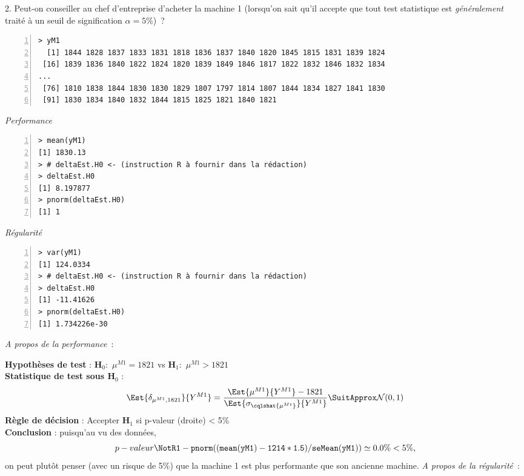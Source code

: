 \documentclass[10pt]{report}
\begin{document}
\begin{exercice}
2. Peut-on conseiller au chef d'entreprise d'acheter la machine 1 (lorsqu'on sait qu'il accepte que tout test statistique est \textit{g{\'e}n{\'e}ralement} trait{\'e} {\`a} un seuil de signification $\alpha=5\%$)~? \\

\IndicR
\begin{Verbatim}[frame=leftline,fontfamily=tt,fontshape=n,numbers=left]
> yM1
  [1] 1844 1828 1837 1833 1831 1818 1836 1837 1840 1820 1845 1815 1831 1839 1824
 [16] 1839 1836 1840 1822 1824 1820 1839 1849 1846 1817 1822 1832 1846 1832 1834
...
 [76] 1810 1838 1844 1830 1830 1829 1807 1797 1814 1807 1844 1834 1827 1841 1830
 [91] 1830 1834 1840 1832 1844 1815 1825 1821 1840 1821
\end{Verbatim}

\noindent \textit{Performance}
\begin{Verbatim}[frame=leftline,fontfamily=tt,fontshape=n,numbers=left]
> mean(yM1)
[1] 1830.13
> # deltaEst.H0 <- (instruction R à fournir dans la rédaction)
> deltaEst.H0
[1] 8.197877
> pnorm(deltaEst.H0)
[1] 1
\end{Verbatim}

\noindent \textit{Régularité}
\begin{Verbatim}[frame=leftline,fontfamily=tt,fontshape=n,numbers=left]
> var(yM1)
[1] 124.0334
> # deltaEst.H0 <- (instruction R à fournir dans la rédaction)
> deltaEst.H0
[1] -11.41626
> pnorm(deltaEst.H0)
[1] 1.734226e-30
\end{Verbatim}

 

\begin{Correction}
\noindent \textit{A propos de la performance}~:

\noindent \textbf{Hypothèses de test} : $\mathbf{H}_0:$ $\mu^{M1}=1821$ vs {\large $\mathbf{H}_1:$ $\mu^{M1}>1821$}\\
\textbf{Statistique de test sous $\mathbf{H}_0$} :
  $$
  \Est{\delta_{\mu^{M1},1821}}{Y^{M1}}= {\displaystyle \frac{\Est{\mu^{M1}}{Y^{M1}}-1821}{
\Est{\sigma_{\cqlshat{\mu^{M1}}}}{Y^{M1}}
}} 
  \SuitApprox \mathcal{N}(0,1)
  $$
\textbf{Règle de décision} : Accepter $\mathbf{H}_1$ si 
  p-valeur (droite) < 5\%\\
\noindent \textbf{Conclusion} :
puisqu'au vu des données, 
  \[
p-valeur\NotR\mathtt{1-pnorm((mean(yM1)-1214*1.5)/seMean(yM1))} \simeq 0.0\% < 5\%,
\]
on peut plutôt penser (avec un risque de 5\%) que la machine 1 est plus performante que son ancienne machine.
\noindent \textit{A propos de la régularité}~:


\end{Correction}
\end{exercice}
\end{document}
